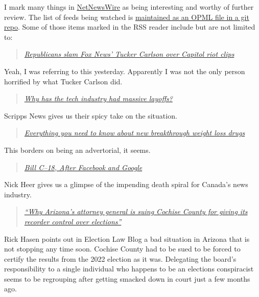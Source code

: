 I mark many things in \href{https://netnewswire.com/}{NetNewsWire} as
being interesting and worthy of further review. The list of feeds being
watched is
\href{https://code.launchpad.net/~skellat/+git/FeedReadingFeeds}{maintained
as an OPML file in a git repo}. Some of those items marked in the RSS
reader include but are not limited to:

\begin{quote}
\emph{\href{https://www.bbc.co.uk/news/world-us-canada-64883668?at_medium=RSS&at_campaign=KARANGA}{Republicans
slam Fox News' Tucker Carlson over Capitol riot clips}}
\end{quote}

Yeah, I was referring to this yesterday. Apparently I was not the only
person horrified by what Tucker Carlson did.

\begin{quote}
\emph{\href{https://scrippsnews.com/stories/why-has-the-tech-industry-had-massive-layoffs/}{Why
has the tech industry had massive layoffs?}}
\end{quote}

Scripps News gives us their spicy take on the situation.

\begin{quote}
\emph{\href{https://scrippsnews.com/stories/what-to-know-about-new-breakthrough-weight-loss-drugs/}{Everything
you need to know about new breakthrough weight loss drugs}}
\end{quote}

This borders on being an advertorial, it seems.

\begin{quote}
\emph{\href{https://pxlnv.com/linklog/bill-c-18-after/}{Bill C--18,
After Facebook and Google}}
\end{quote}

Nick Heer gives us a glimpse of the impending death spiral for Canada's
news industry.

\begin{quote}
\emph{\href{https://electionlawblog.org/?p=135002}{``Why Arizona's
attorney general is suing Cochise County for giving its recorder control
over elections''}}
\end{quote}

Rick Hasen points out in Election Law Blog a bad situation in Arizona
that is not stopping any time soon. Cochise County had to be sued to be
forced to certify the results from the 2022 election as it was.
Delegating the board's responsibility to a single individual who happens
to be an elections conspiracist seems to be regrouping after getting
smacked down in court just a few months ago.

